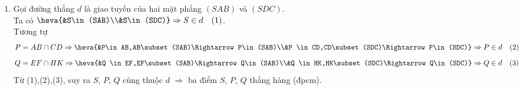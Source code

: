 \begin{bt}
\begin{bt}
{\begin{enumerate}
			$$N=EK\cap FH \Rightarrow \heva{&N \in EK,EK\subset (SAD)\Rightarrow N\in(SAD)\\&N \in FH,FH\subset (SBC)\Rightarrow N\in(SBC)}\Rightarrow N\in d\quad (3)$$
			Từ (1),(2),(3), suy ra $S$, $M$, $N$ cùng thuộc $d$ $\Rightarrow$ ba điểm $S$, $M$, $N$ thẳng hàng (đpcm).
			\item Gọi đường thẳng $d$ là giao tuyến của hai mặt phẳng $(SAB)$ và $(SDC)$.\\
			Ta có 
			$\heva{&S\in(SAB)\\&S\in(SDC)}\Rightarrow S\in d\quad (1)$.\\
			Tương tự
			$$P=AB\cap CD \Rightarrow \heva{&P\in AB,AB\subset (SAB)\Rightarrow P\in(SAB)\\&P \in CD,CD\subset (SDC)\Rightarrow P\in(SDC)}\Rightarrow P\in d\quad (2)$$
			$$Q=EF\cap HK \Rightarrow \heva{&Q \in EF,EF\subset (SAB)\Rightarrow Q\in(SAB)\\&Q \in HK,HK\subset (SDC)\Rightarrow Q\in(SDC)}\Rightarrow Q\in d\quad (3)$$
			Từ (1),(2),(3), suy ra $S$, $P$, $Q$ cùng thuộc $d$ $\Rightarrow$ ba điểm $S$, $P$, $Q$ thẳng hàng (đpcm).
		\end{enumerate}	
	}
\end{bt}


\end{bt}
